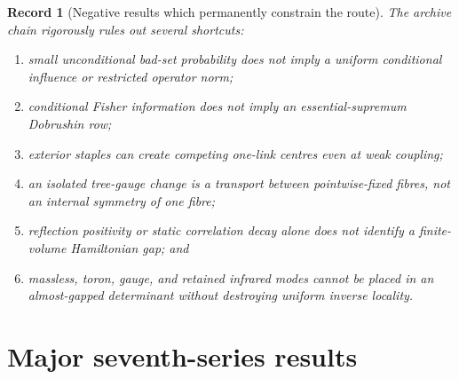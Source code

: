 \documentclass[11pt,oneside]{book}
\newtheorem{record}[theorem]{Record}
\theoremstyle{definition}
\theoremstyle{remark}
\begin{document}
\begin{record}[Negative results which permanently constrain the route]
\label{rec:e8v1-no-go}
The archive chain rigorously rules out several shortcuts:
\begin{enumerate}[label=\textup{(\roman*)},leftmargin=3.5em]
\item small unconditional bad-set probability does not imply a uniform
      conditional influence or restricted operator norm;
\item conditional Fisher information does not imply an
      essential-supremum Dobrushin row;
\item exterior staples can create competing one-link centres even at
      weak coupling;
\item an isolated tree-gauge change is a transport between
      pointwise-fixed fibres, not an internal symmetry of one fibre;
\item reflection positivity or static correlation decay alone does
      not identify a finite-volume Hamiltonian gap; and
\item massless, toron, gauge, and retained infrared modes cannot be
      placed in an almost-gapped determinant without destroying
      uniform inverse locality.
\end{enumerate}
\end{record}

\section{Major seventh-series results}
\label{sec:e8v1-seventh}
\end{document}
